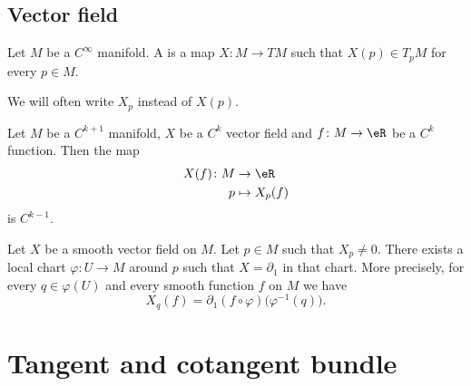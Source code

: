 \subsection{Vector field}

\begin{definition}        \label{DEFooAATTooLhNqDb}
	Let \( M\) be a \(  C^{\infty}\) manifold. A  is a map \( X\colon M\to TM\) such that \( X(p)\in T_pM\) for every \( p\in M\).

	We will often write \( X_p\) instead of \( X(p)\).
\end{definition}

\begin{proposition}         \label{PROPooGYWRooPIyocN}
	Let \( M\) be a \( C^{k+1}\) manifold, \( X\) be a \( C^k\) vector field and \( f\colon M \to \eR\) be a \( C^k\) function. Then the map
	\begin{equation}
		\begin{aligned}
			X(f)\colon M & \to \eR        \\
			p            & \mapsto X_p(f)
		\end{aligned}
	\end{equation}
	is \( C^{k-1}\).
\end{proposition}

\begin{lemma}       \label{LEMooLNIAooCmbLQp}
	Let \( X\) be a smooth vector field on \( M\). Let \( p\in M\) such that \( X_p\neq 0\). There exists a local chart \( \varphi\colon U\to M\) around \( p\) such that \( X=\partial_1\) in that chart. More precisely, for every \( q\in \varphi(U)\) and every smooth function \( f\) on \( M\) we have
	\begin{equation}
		X_q(f)=\partial_1(f\circ \varphi)\big( \varphi^{-1}(q) \big).
	\end{equation}
\end{lemma}


\section{Tangent and cotangent bundle}

